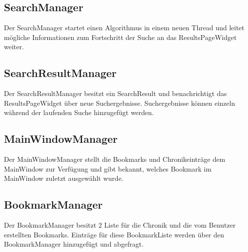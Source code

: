 \subsection*{SearchManager}
Der SearchManager startet einen Algorithmus in einem neuen Thread und leitet mögliche Informationen zum Fortschritt der Suche an das ResultsPageWidget weiter.

\subsection*{SearchResultManager}
Der SearchResultManager besitzt ein SearchResult und benachrichtigt das ResultsPageWidget über neue Suchergebnisse. Suchergebnisse können einzeln während der laufenden Suche hinzugefügt werden.

\subsection*{MainWindowManager}
Der MainWindowManager stellt die Bookmarks und Chronikeinträge dem MainWindow zur Verfügung und gibt bekannt, welches Bookmark im MainWindow zuletzt ausgewählt wurde.

\subsection*{BookmarkManager}
Der BookmarkManager besitzt 2 Liste für die Chronik und die vom Benutzer erstellten Bookmarks. Einträge für diese BookmarkListe werden über den BookmarkManager hinzugefügt und abgefragt.
